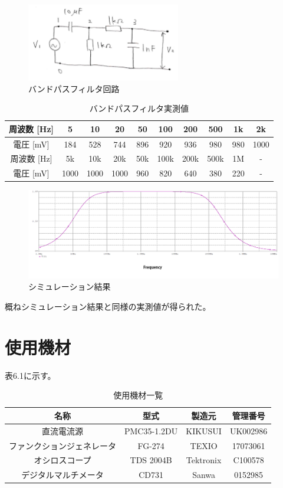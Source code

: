 \documentclass{jlreq}
\numberwithin{equation}{section}
\begin{document}
\begin{figure}[H]
  \centering
  \includegraphics[width=0.6\textwidth]{assets/bandpasskairo.png}
  \caption{バンドパスフィルタ回路}
\end{figure}

\begin{table}[H]
  \centering
    \caption{バンドパスフィルタ実測値}
    \begin{tabular}{|c|c|c|c|c|c|c|c|c|c|}
      \hline
      周波数 [Hz] & 5 & 10 & 20 & 50 & 100 & 200 & 500 & 1k & 2k \\ \hline
      電圧 [mV] & 184 & 528 & 744 & 896 & 920 & 936 & 980 & 980 & 1000 \\ \hline
      \hline
      周波数 [Hz] & 5k & 10k & 20k & 50k & 100k & 200k & 500k & 1M & - \\ \hline
      電圧 [mV] & 1000 & 1000 & 1000 & 960 & 820 & 640 & 380 & 220 & - \\ \hline
    \end{tabular}
\end{table}

\begin{figure}[H]
  \centering
  \includegraphics[width=\textwidth]{assets/bandpass.png}
  \caption{シミュレーション結果}
\end{figure}

概ねシミュレーション結果と同様の実測値が得られた。

\section{使用機材}
表6.1に示す。
\begin{table}[H]
  \centering
  \caption{使用機材一覧}
  \begin{tabular}{|c|c|c|c|}
    \hline
    名称 & 型式 & 製造元 & 管理番号 \\ \hline
    直流電流源 & PMC35-1.2DU & KIKUSUI & UK002986 \\ \hline
    ファンクションジェネレータ & FG-274 & TEXIO & 17073061 \\ \hline
    オシロスコープ & TDS 2004B & Tektronix & C100578 \\ \hline
    デジタルマルチメータ & CD731 & Sanwa & 0152985 \\ \hline
  \end{tabular}
\end{table}
\end{document}
